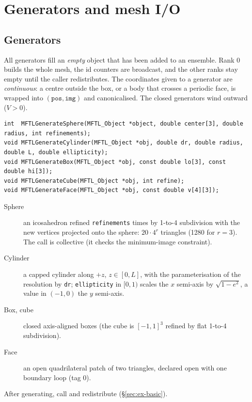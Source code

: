 \chapter{Generators and mesh I/O}
\label{ch:generators}

\section{Generators}

All generators fill an \emph{empty} object that has been added to an ensemble. Rank 0 builds
the whole mesh, the id counters are broadcast, and the other ranks stay empty until the caller
redistributes. The coordinates given to a generator are \emph{continuous}: a centre outside the
box, or a body that crosses a periodic face, is wrapped into $(\texttt{pos},\texttt{img})$ and
canonicalised. The closed generators wind outward ($V>0$).

\begin{lstlisting}[numbers=none]
int  MFTLGenerateSphere(MFTL_Object *object, double center[3], double radius, int refinements);
void MFTLGenerateCylinder(MFTL_Object *obj, double dr, double radius, double L, double ellipticity);
void MFTLGenerateBox(MFTL_Object *obj, const double lo[3], const double hi[3]);
void MFTLGenerateCube(MFTL_Object *obj, int refine);
void MFTLGenerateFace(MFTL_Object *obj, const double v[4][3]);
\end{lstlisting}
\begin{description}
  \item[Sphere] an icosahedron refined \texttt{refinements} times by 1-to-4 subdivision with the
    new vertices projected onto the sphere: $20\cdot4^{r}$ triangles (1280 for $r=3$). The call is
    collective (it checks the minimum-image constraint).
  \item[Cylinder] a capped cylinder along $+z$, $z\in[0,L]$, with the \mftlone{}
    parameterisation of the resolution by \texttt{dr}; \texttt{ellipticity} in $[0,1)$ scales the
    $x$ semi-axis by $\sqrt{1-e^2}$, a value in $(-1,0)$ the $y$ semi-axis.
  \item[Box, cube] closed axis-aligned boxes (the cube is $[-1,1]^3$ refined by flat 1-to-4
    subdivision).
  \item[Face] an open quadrilateral patch of two triangles, declared open with one boundary loop
    (tag 0).
\end{description}
After generating, call  and redistribute
(\S\ref{sec:ex-basic}).

